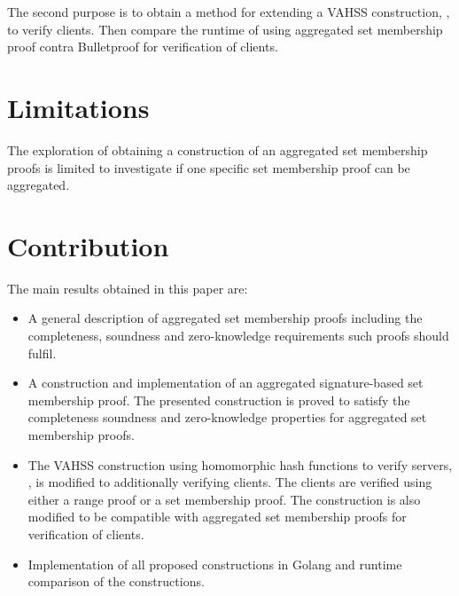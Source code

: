 The second purpose is to obtain a method for extending a VAHSS construction, \cite{SumItUp}, to verify clients. Then compare the runtime of using aggregated set membership proof contra Bulletproof for verification of clients.

\section*{Limitations}
The exploration of obtaining a construction of an aggregated set membership proofs is limited to investigate if one specific set membership proof can be aggregated. 




\section*{Contribution}
The main results obtained in this paper are:
\begin{itemize}
\item A general description of aggregated set membership proofs including the completeness, soundness and zero-knowledge requirements such proofs should fulfil. 

\item A construction and implementation of an aggregated signature-based set membership proof. The presented construction is proved to satisfy the completeness soundness and zero-knowledge properties for aggregated set membership proofs.

\item The VAHSS construction using homomorphic hash functions to verify servers, \cite{SumItUp}, is modified to additionally verifying clients. The clients are verified using either a range proof or a set membership proof. The construction is also modified to be compatible with aggregated set membership proofs for verification of clients.

\item Implementation of all proposed constructions in Golang and runtime comparison of the constructions.
\end{itemize}

